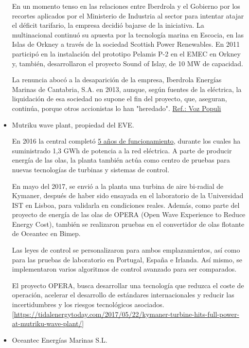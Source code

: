 \begin{itemize}
  En un momento tenso en las relaciones entre Iberdrola y el Gobierno
  por los recortes aplicados por el Ministerio de Industria al sector
  para intentar atajar el déficit tarifario, la empresa decidió bajarse
  de la iniciativa. La multinacional continuó su apuesta por la
  tecnología marina en Escocia, en las Islas de Orkney a través de la
  sociedad Scottish Power Renewables. En 2011 participó en la
  instalación del prototipo Pelamis P-2 en el EMEC en Orkney y, también,
  desarrollaron el proyecto Sound of Islay, de 10 MW de capacidad.

  La renuncia abocó a la desaparición de la empresa, Iberdrola Energías
  Marinas de Cantabria, S.A. en 2013, aunque, según fuentes de la
  eléctrica, la liquidación de esa sociedad no supone el fin del
  proyecto, que, aseguran, continúa, porque otros accionistas lo han
  "heredado".
  \href{https://www.vozpopuli.com/economia-y-finanzas/empresas/Iberdrola-Energia_marina-Cantabria_0_642535793.html}{Ref.:
  Voz Populi}
\item
  Mutriku wave plant, propiedad del EVE.

  En 2016 la central completó
  \href{https://tidalenergytoday.com/2016/07/19/mutriku-wave-plant-generates-over-1gwh-of-clean-power/}{5
  años de funcionamiento}, durante los cuales ha suministrado 1,3 GWh de
  potencia a la red eléctrica. A parte de producir energía de las olas,
  la planta también actúa como centro de pruebas para nuevas tecnologías
  de turbinas y sistemas de control.

  En mayo del 2017, se envió a la planta una turbina de aire bi-radial
  de Kymaner, después de haber sido ensayada en el laboratorio de la
  Universidad IST en Lisboa, para validarla en condiciones reales.
  Además, como parte del proyecto de energía de las olas de OPERA (Open
  Wave Experience to Reduce Energy Cost), también se realizaron pruebas
  en el convertidor de olas flotante de Oceantec en Bimep.

  Las leyes de control se personalizaron para ambos emplazamientos, así
  como para las pruebas de laboratorio en Portugal, España e Irlanda.
  Así mismo, se implementaron varios algoritmos de control avanzado para
  ser comparados.

  El proyecto OPERA, busca desarrollar una tecnología que reduzca el
  coste de operación, acelerar el desarrollo de estándares
  internacionales y reducir las incertidumbres y los riesgos
  tecnológicos asociados.
  {[}\url{https://tidalenergytoday.com/2017/05/22/kymaner-turbine-hits-full-power-at-mutriku-wave-plant/}{]}
\item
  Oceantec Energías Marinas S.L.


\end{itemize}
